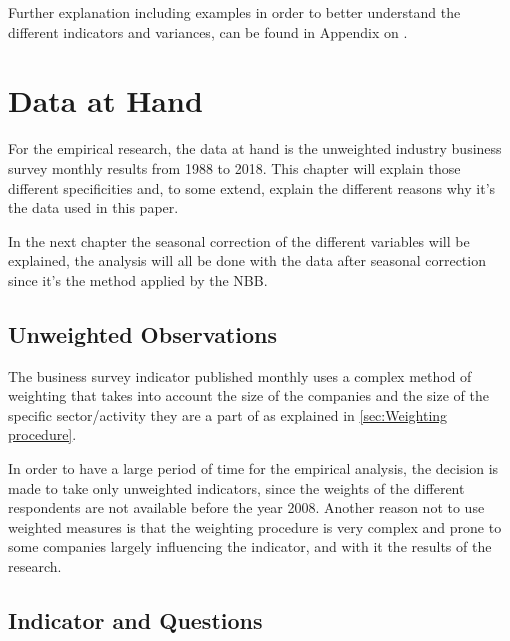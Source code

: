 \documentclass[12pt,a4paper,oneside]{book}
\begin{document}
Further explanation including examples in order to better understand the different indicators and variances, can be found in Appendix on .




\chapter{Data at Hand}

For the empirical research, the data at hand is the unweighted industry business survey monthly results from 1988 to 2018.
This chapter will explain those different specificities and, to some extend, explain the different reasons why it's the data used in this paper.

In the next chapter the seasonal correction of the different variables will be explained, the analysis will all be done with the data after seasonal correction since it's the method applied by the NBB.

\section{Unweighted Observations}

The business survey indicator published monthly uses a complex method of weighting that takes into account the size of the companies and the size of the specific sector/activity they are a part of as explained in \autoref{sec:Weighting procedure}.

In order to have a large period of time for the empirical analysis, the decision is made to take only unweighted indicators, since the weights of the different respondents are not available before the year 2008. 
Another reason not to use weighted measures is that the weighting procedure is very complex and prone to some companies largely influencing the indicator, and with it the results of the research. 





\section{Indicator and Questions}
\end{document}
